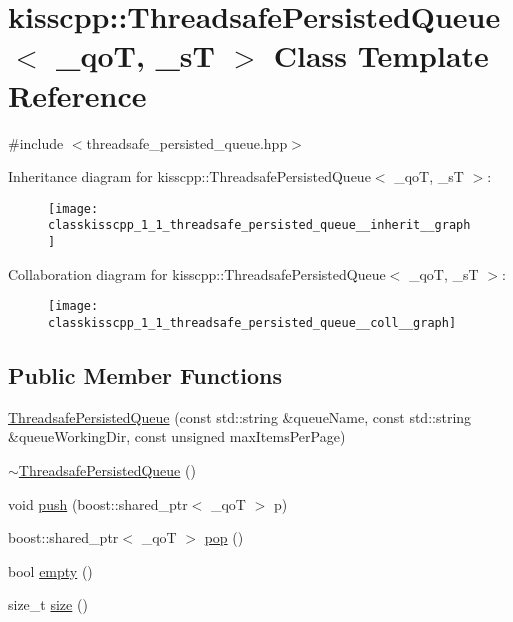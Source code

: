 \hypertarget{classkisscpp_1_1_threadsafe_persisted_queue}{\section{kisscpp\-:\-:Threadsafe\-Persisted\-Queue$<$ \-\_\-qo\-T, \-\_\-s\-T $>$ Class Template Reference}
\label{classkisscpp_1_1_threadsafe_persisted_queue}
}


{\ttfamily \#include $<$threadsafe\-\_\-persisted\-\_\-queue.\-hpp$>$}



Inheritance diagram for kisscpp\-:\-:Threadsafe\-Persisted\-Queue$<$ \-\_\-qo\-T, \-\_\-s\-T $>$\-:
\nopagebreak
\begin{figure}[H]
\begin{center}
\leavevmode
\texttt{[image: classkisscpp\_1\_1\_threadsafe\_persisted\_queue\_\_inherit\_\_graph]}
\end{center}
\end{figure}


Collaboration diagram for kisscpp\-:\-:Threadsafe\-Persisted\-Queue$<$ \-\_\-qo\-T, \-\_\-s\-T $>$\-:
\nopagebreak
\begin{figure}[H]
\begin{center}
\leavevmode
\texttt{[image: classkisscpp\_1\_1\_threadsafe\_persisted\_queue\_\_coll\_\_graph]}
\end{center}
\end{figure}
\subsection*{Public Member Functions}
\begin{DoxyCompactItemize}
\item 
\hyperlink{classkisscpp_1_1_threadsafe_persisted_queue_a97cf702d8b42b4c8fe0b5322dd400778}{Threadsafe\-Persisted\-Queue} (const std\-::string \&queue\-Name, const std\-::string \&queue\-Working\-Dir, const unsigned max\-Items\-Per\-Page)
\item 
\hyperlink{classkisscpp_1_1_threadsafe_persisted_queue_aa5501a8a59b8c72d9684c4c956cd1de8}{$\sim$\-Threadsafe\-Persisted\-Queue} ()
\item 
void \hyperlink{classkisscpp_1_1_threadsafe_persisted_queue_ab4be3f974ebbad4fe5ca9c567b0a7de4}{push} (boost\-::shared\-\_\-ptr$<$ \-\_\-qo\-T $>$ p)
\item 
boost\-::shared\-\_\-ptr$<$ \-\_\-qo\-T $>$ \hyperlink{classkisscpp_1_1_threadsafe_persisted_queue_ac641d52fdd2c291f1ae4799e09ef8933}{pop} ()
\item 
bool \hyperlink{classkisscpp_1_1_threadsafe_persisted_queue_a5acc045d1b5650aab56b1ea33372f007}{empty} ()
\item 
size\-\_\-t \hyperlink{classkisscpp_1_1_threadsafe_persisted_queue_ad534f615da86716d4cf8a10d32fe11ce}{size} ()
\end{DoxyCompactItemize}


